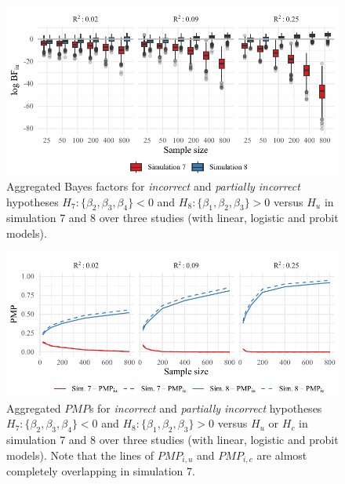\documentclass[
]{article}
\begin{document}
\begin{figure}[!t]

{\centering \includegraphics[width=1\textwidth,height=\textheight]{manuscript_VK_files/figure-pdf/fig-BF78-1.pdf}

}

\caption{\label{fig-BF78}Aggregated Bayes factors for \textit{incorrect}
and \textit{partially incorrect} hypotheses
\(H_7: \{\beta_2, \beta_3, \beta_4\} < 0\) and
\(H_8: \{\beta_1, \beta_2, \beta_3\} > 0\) versus \(H_u\) in simulation
7 and 8 over three studies (with linear, logistic and probit models).}

\end{figure}

\begin{figure}[!t]

{\centering \includegraphics[width=1\textwidth,height=\textheight]{manuscript_VK_files/figure-pdf/fig-PMP78-1.pdf}

}

\caption{\label{fig-PMP78}Aggregated \(PMP\)s for \textit{incorrect} and
\textit{partially incorrect} hypotheses
\(H_7: \{\beta_2, \beta_3, \beta_4\} < 0\) and
\(H_8: \{\beta_1, \beta_2, \beta_3\} > 0\) versus \(H_u\) or \(H_c\) in
simulation 7 and 8 over three studies (with linear, logistic and probit
models). Note that the lines of \(PMP_{i,u}\) and \(PMP_{i,c}\) are
almost completely overlapping in simulation 7.}

\end{figure}
\end{document}
